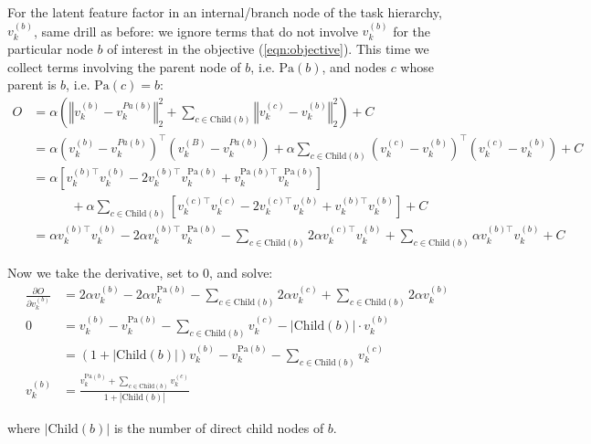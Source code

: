 \documentclass{article}
\begin{document}
For the latent feature factor in an internal/branch node of the task hierarchy, $v^{(b)}_{k}$, same drill as before: we ignore terms that do not involve $v^{(b)}_{k}$ for the particular node $b$ of interest in the objective (\ref{eqn:objective}). This time we collect terms involving the parent node of $b$, i.e. $\text{Pa}(b)$, and nodes $c$ whose parent is $b$, i.e. $\text{Pa}(c) = b$:
\begin{align}
O &=\alpha 
\left(
\left\Vert v^{(b)}_{k} - v^{Pa(b)}_{k} \right\Vert_\text{2}^2 
+ \sum_{c \in \text{Child}(b)} \left\Vert v^{(c)}_{k} - v^{(b)}_{k} \right\Vert_\text{2}^2 
\right) + C\\
&=
\alpha 
\left(
v^{(b)}_{k} - v^{Pa(b)}_{k}
\right)^\top 
\left(
v^{(B)}_{k} - v^{Pa(b)}_{k}
\right)
+ \alpha  \sum_{c \in \text{Child}(b)}
\left(
v^{(c)}_{k} - v^{(b)}_{k}
\right)^\top 
\left(
v^{(c)}_{k} - v^{(b)}_{k}
\right)
+ C\\
&= 
\alpha \left[
v^{(b)\top}_{k} v^{(b)}_{k} - 2 v^{(b)\top}_{k}v^{\text{Pa}(b)}_{k} + v^{\text{Pa}(b)\top}_{k} v^{\text{Pa}(b)}_{k}
\right] \nonumber \\
&\quad\quad\quad + \alpha
\sum_{c \in \text{Child}(b)} \left[ 
v^{(c)\top}_{k} v^{(c)}_{k} - 2 v^{(c)\top}_{k}v^{(b)}_{k} + v^{(b)\top}_{k} v^{(b)}_{k} \right] + C\\
&= 
\alpha v^{(b)\top}_{k} v^{(b)}_{k}
- 2\alpha v^{(b)\top}_{k}v^{\text{Pa}(b)}_{k}
-  \sum_{c \in \text{Child}(b)} 2\alpha  v^{(c)\top}_{k} v^{(b)}_{k}
+ \sum_{c \in \text{Child}(b)} \alpha v^{(b)\top}_{k} v^{(b)}_{k}
 +C
\end{align}

Now we take the derivative, set to $0$, and solve:
\begin{align}
\frac{\partial O}{\partial v^{(b)}_{k}} 
&=
2\alpha v^{(b)}_{k}
- 2\alpha v^{\text{Pa}(b)}_{k}
- \sum_{c \in \text{Child}(b)} 2 \alpha v^{(c)}_{k} 
+ \sum_{c \in \text{Child}(b)} 2 \alpha  v^{(b)}_{k}   \\
0 &=  
v^{(b)}_{k} - v^{\text{Pa}(b)}_{k} 
- \sum_{c \in \text{Child}(b)} v^{(c)}_{k} 
-  | \text{Child}(b) | \cdot v^{(b)}_{k} \\
&= (1 + | \text{Child}(b) | ) v^{(b)}_{k} - v^{\text{Pa}(b)}_{k} 
- \sum_{c \in \text{Child}(b)} v^{(c)}_{k}  \\
v^{(b)}_{k} & = \frac{v^{\text{Pa}(b)}_{k} + \sum_{c \in \text{Child}(b)} v^{(c)}_{k} }{1 + | \text{Child}(b) | }
\end{align}

where $| \text{Child}(b) | $ is the number of direct child nodes of $b$.
\end{document}
